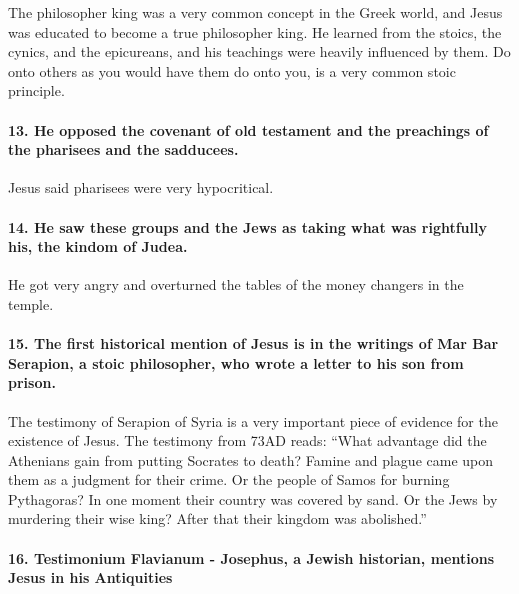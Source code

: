 The philosopher king was a very common concept in the Greek world, and Jesus was educated to become a true philosopher king.
He learned from the stoics, the cynics, and the epicureans, and his teachings were heavily influenced by them.
Do onto others as you would have them do onto you, is a very common stoic principle.

\paragraph{13.
He opposed the covenant of old testament and the preachings of the pharisees and the sadducees.}\label{par:he-opposed-the-covenant-of-old-testament-and-the-preachings-of-the-pharisees-and-the-sadducees.}

Jesus said pharisees were very hypocritical.

\paragraph{14.
He saw these groups and the Jews as taking what was rightfully his, the kindom of Judea.}\label{par:he-saw-these-groups-and-the-jews-as-taking-what-was-rightfully-his-the-kindom-of-judea.}

He got very angry and overturned the tables of the money changers in the temple.

\paragraph{15.
The first historical mention of Jesus is in the writings of Mar Bar Serapion, a stoic philosopher, who wrote a letter to his son from prison.}\label{par:the-first-historical-mention-of-jesus-is-in-the-writings-of-mar-bar-serapion-a-stoic-philosopher-who-wrote-a-letter-to-his-son-from-prison.}

The testimony of Serapion of Syria is a very important piece of evidence for the existence of Jesus.
The testimony from 73AD reads: ``What advantage did the Athenians gain from putting Socrates to death?
Famine and plague came upon them as a judgment for their crime.
Or the people of Samos for burning Pythagoras?
In one moment their country was covered by sand.
Or the Jews by murdering their wise king?
After that their kingdom was abolished.''

\paragraph{16.
Testimonium Flavianum - Josephus, a Jewish historian, mentions Jesus in his Antiquities}\label{par:testimonium-flavianum---josephus-a-jewish-historian-mentions-jesus-in-his-antiquities}

